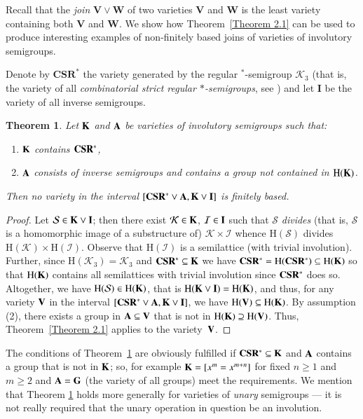 \documentclass[preprint,1p,times]{elsarticle}
\numberwithin{equation}{section}
\newtheorem{Thm}{Theorem}[section]
\theoremstyle{remark}
\def\pv#1{{\bf #1}}
\def\H{\mathrm H}
\begin{document}
Recall that the \emph{join} $\mathbf{V}\vee\mathbf{W}$ of two varieties $\mathbf{V}$ and $\mathbf{W}$ is the least
variety containing both $\mathbf{V}$ and $\mathbf{W}$. We show how Theorem~\ref{Theorem 2.1} can be used to produce
interesting examples of non-finitely based joins of varieties of involutory semigroups.

Denote by $\mathbf{CSR^*}$ the variety generated by the regular $^*$-semigroup $\mathcal{K}_3$ (that is, the variety of all
\emph{combinatorial strict regular $*$-semigroups}, see \cite{A1}) and let $\mathbf{I}$ be the variety of all inverse
semigroups.
\begin{Thm}
\label{Theorem 3.2} Let $\pv K$ and $\pv A$ be varieties of involutory semigroups such that:
\begin{enumerate}
\item $\pv K$ contains $\pv{CSR^*}$,
\item $\pv A$ consists of inverse semigroups and contains
a group not contained in $\H(\pv K)$.
\end{enumerate}
Then no variety in the interval $[\pv{CSR^*}\vee \pv A, \pv K\vee\pv{I}]$ is finitely based.
\end{Thm}

\begin{proof}
Let $\mathcal{S}\in \pv K\vee\pv I$; then there exist $\mathcal{K}\in \pv K$, $\mathcal{I}\in \pv I$ such that
$\mathcal{S}$ \emph{divides} (that is, $\mathcal{S}$ is a homomorphic image of a substructure of)
$\mathcal{K}\times\mathcal{I}$ whence $\H(\mathcal{S})$ divides $\H(\mathcal{K})\times \H(\mathcal{I})$. Observe that
$\H(\mathcal{I})$ is a semilattice (with trivial involution). Further, since $\H(\mathcal{K}_3)=\mathcal{K}_3$ and $\pv
{CSR^*}\subseteq \pv K$ we have $\pv{CSR^*}=\H(\pv{CSR^*})\subseteq \H (\pv K)$ so that $\H (\pv K)$ contains all
semilattices with trivial involution since $\pv{CSR^*}$ does so. Altogether, we have $\H(\mathcal{S})\in \H(\pv K)$,
that is $\H(\pv K\vee\pv I)=\H(\pv K)$, and thus, for any variety $\pv V$ in the interval $[\pv{CSR^*}\vee \pv A, \pv
K\vee\pv{I}]$, we have $\H(\pv V)\subseteq \H(\pv K)$. By assumption (2), there exists a group in $\pv A\subseteq \pv
V$ that is not in $\H(\pv K)\supseteq \H(\pv V)$. Thus, Theorem~\ref{Theorem 2.1} applies to the variety~$\pv V$.
\end{proof}

The conditions of Theorem~\ref{Theorem 3.2} are obviously fulfilled if $\pv{CSR^*}\subseteq \pv K$ and $\pv A$ contains
a group that is not in $\pv K$; so, for example $\pv K=[x^m=x^{m+n}]$ for fixed $n\ge 1$ and $m\ge 2$ and $\pv A=\pv G$
(the variety of all groups) meet the requirements. We mention that Theorem \ref{Theorem 3.2} holds more generally for
varieties of \emph{unary} semigroups --- it is not really required that the unary operation in question be an
involution.
\end{document}
